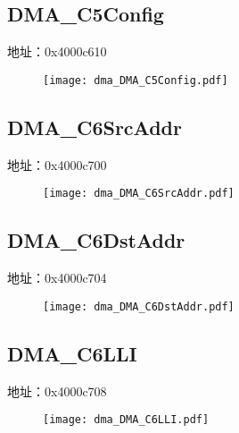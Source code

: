 \subsection{DMA\_C5Config}
\label{dma-DMA-C5Config}
地址：0x4000c610
 \begin{figure}[H]
\texttt{[image: dma\_DMA\_C5Config.pdf]}
\end{figure}

\subsection{DMA\_C6SrcAddr}
\label{dma-DMA-C6SrcAddr}
地址：0x4000c700
 \begin{figure}[H]
\texttt{[image: dma\_DMA\_C6SrcAddr.pdf]}
\end{figure}

\subsection{DMA\_C6DstAddr}
\label{dma-DMA-C6DstAddr}
地址：0x4000c704
 \begin{figure}[H]
\texttt{[image: dma\_DMA\_C6DstAddr.pdf]}
\end{figure}

\subsection{DMA\_C6LLI}
\label{dma-DMA-C6LLI}
地址：0x4000c708
 \begin{figure}[H]
\texttt{[image: dma\_DMA\_C6LLI.pdf]}
\end{figure}

